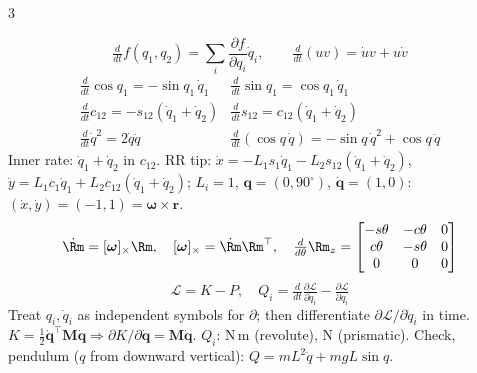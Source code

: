\begin{multicols}{3}
\begin{fbx}
\[\tfrac d{dt}f(q_1,q_2)=\textstyle\sum_i\frac{\partial f}{\partial q_i}\dot q_i,\qquad\tfrac d{dt}(uv)=\dot uv+u\dot v\]
\[\begin{array}{ll}\frac d{dt}\cos q_1=-\sin q_1\,\dot q_1&\frac d{dt}\sin q_1=\cos q_1\,\dot q_1\\[2pt]
\frac d{dt}c_{12}=-s_{12}(\dot q_1+\dot q_2)&\frac d{dt}s_{12}=c_{12}(\dot q_1+\dot q_2)\\[2pt]
\frac d{dt}\dot q^2=2\dot q\ddot q&\frac d{dt}(\cos q\,\dot q)=-\sin q\,\dot q^2+\cos q\,\ddot q\end{array}\]
Inner rate: $\dot q_1+\dot q_2$ in $c_{12}$. RR tip: $\dot x=-L_1s_1\dot q_1-L_2s_{12}(\dot q_1+\dot q_2)$, $\dot y=L_1c_1\dot q_1+L_2c_{12}(\dot q_1+\dot q_2)$; $L_i=1$, $\mathbf q=(0,90^\circ)$, $\dot{\mathbf q}=(1,0)$: $(\dot x,\dot y)=(-1,1)=\boldsymbol\omega\times\mathbf r$. \chk
\[\dot\Rm=[\boldsymbol\omega]_\times\Rm,\quad[\boldsymbol\omega]_\times=\dot\Rm\Rm^\top,\quad\tfrac d{d\theta}\Rm_z=\begin{bmatrix}-s\theta&-c\theta&0\\c\theta&-s\theta&0\\0&0&0\end{bmatrix}\]
\[\mathcal L=K-P,\quad Q_i=\tfrac d{dt}\tfrac{\partial\mathcal L}{\partial\dot q_i}-\tfrac{\partial\mathcal L}{\partial q_i}\]
Treat $q_i,\dot q_i$ as independent symbols for $\partial$; then differentiate $\partial\mathcal L/\partial\dot q_i$ in time. $K=\frac12\dot{\mathbf q}^\top\mathbf M\dot{\mathbf q}\Rightarrow\partial K/\partial\dot{\mathbf q}=\mathbf M\dot{\mathbf q}$. $Q_i$: N\,m (revolute), N (prismatic). Check, pendulum ($q$ from downward vertical): $Q=mL^2\ddot q+mgL\sin q$. \chk
\end{fbx}


\end{multicols}
